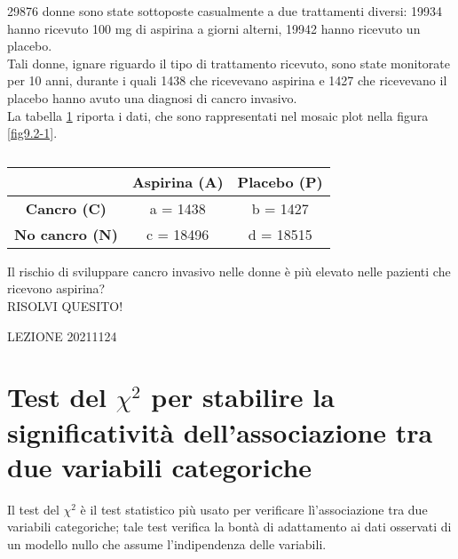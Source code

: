 \documentclass[drafts, 10pt]{book}
\newcounter{example}[section]
\begin{document}
\begin{example}
29876 donne sono state sottoposte casualmente a due trattamenti diversi: 19934 hanno ricevuto 100 mg di aspirina a giorni alterni, 19942 hanno ricevuto un placebo.
\\
Tali donne, ignare riguardo il tipo di trattamento ricevuto, sono state monitorate per 10 anni, durante i quali 1438 che ricevevano aspirina e 1427 che ricevevano il placebo hanno avuto una diagnosi di cancro invasivo.
\\
La tabella \ref{tabaspirina} riporta i dati, che sono rappresentati nel mosaic plot nella figura \ref{fig9.2-1}.
\begin{table}[H]
        \centering
        \renewcommand\arraystretch{1.2}
        \begin{tabular}{c|c|c}
        \hline
         & \textbf{Aspirina (A)} & \textbf{Placebo (P)}\\
        \hline
        \textbf{Cancro (C)} & a = 1438 & b = 1427 \\
        \hline
        \textbf{No cancro (N)} & c = 18496 & d = 18515\\
        \hline
        \end{tabular}
        \caption{}
        \label{tabaspirina}
\end{table}\noindent
    Il rischio di sviluppare cancro invasivo nelle donne è più elevato nelle pazienti che ricevono aspirina?
    \\
    RISOLVI QUESITO!
\end{example}

\begin{example}
LEZIONE 20211124
\end{example}

\section{Test del \texorpdfstring{$\chi^2$}{Lg} per stabilire la significatività dell'associazione tra due variabili categoriche}

Il test del $\chi^2$ è il test statistico più usato per verificare lì'associazione tra due variabili categoriche; tale test verifica la bontà di adattamento ai dati osservati di un modello nullo che assume l'indipendenza delle variabili.
\end{document}
